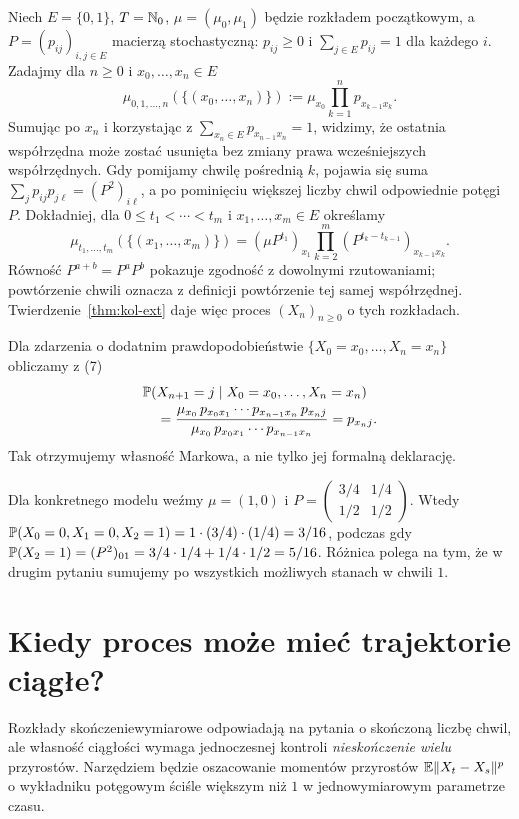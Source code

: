 \begin{przyklad}
Niech $E=\{0,1\}$, $T=\mathbb{N}_0$, $\mu=(\mu_0,\mu_1)$
będzie rozkładem początkowym, a
$P=(p_{ij})_{i,j\in E}$ macierzą stochastyczną:
$p_{ij}\ge0$ i $\sum_{j\in E}p_{ij}=1$ dla każdego $i$.
Zadajmy dla $n\ge0$ i $x_0,\ldots,x_n\in E$
\[
\mu_{0,1,\ldots,n}(\{(x_0,\ldots,x_n)\})
:=\mu_{x_0}\prod_{k=1}^n p_{x_{k-1}x_k}.
\tag{7}
\]
Sumując po $x_n$ i korzystając z
$\sum_{x_n\in E}p_{x_{n-1}x_n}=1$, widzimy,
że ostatnia współrzędna może zostać usunięta
bez zmiany prawa wcześniejszych współrzędnych.
Gdy pomijamy chwilę pośrednią $k$, pojawia się suma
$\sum_j p_{ij}p_{j\ell}=(P^2)_{i\ell}$,
a po pominięciu większej liczby chwil
odpowiednie potęgi $P$.
Dokładniej, dla $0\le t_1<\cdots<t_m$ i
$x_1,\ldots,x_m\in E$ określamy
\[
\mu_{t_1,\ldots,t_m}(\{(x_1,\ldots,x_m)\})
=(\mu P^{t_1})_{x_1}
\prod_{k=2}^m (P^{t_k-t_{k-1}})_{x_{k-1}x_k}.
\]
Równość $P^{a+b}=P^aP^b$ pokazuje zgodność
z dowolnymi rzutowaniami; powtórzenie chwili
oznacza z definicji powtórzenie tej samej współrzędnej.
Twierdzenie~\ref{thm:kol-ext} daje więc proces
$(X_n)_{n\ge0}$ o tych rozkładach.

Dla zdarzenia o dodatnim prawdopodobieństwie
$\{X_0=x_0,\ldots,X_n=x_n\}$ obliczamy z (7)
\[
\begin{aligned}
&\mathbb{P}(X_{n+1}=j\mid X_0=x_0,\ldots,X_n=x_n)\\
&\quad=\frac{\mu_{x_0}\,p_{x_0x_1}\cdots
p_{x_{n-1}x_n}\,p_{x_nj}}
{\mu_{x_0}\,p_{x_0x_1}\cdots p_{x_{n-1}x_n}}
=p_{x_nj}.
\end{aligned}
\]
Tak otrzymujemy własność Markowa, a nie tylko
jej formalną deklarację.

Dla konkretnego modelu weźmy
$\mu=(1,0)$ i
$P=\begin{pmatrix}3/4&1/4\\1/2&1/2\end{pmatrix}$.
Wtedy $\mathbb{P}(X_0=0,X_1=0,X_2=1)
=1\cdot(3/4)\cdot(1/4)=3/16$, podczas gdy
$\mathbb{P}(X_2=1)=(P^2)_{01}
=3/4\cdot1/4+1/4\cdot1/2=5/16$.
Różnica polega na tym, że w drugim pytaniu
sumujemy po wszystkich możliwych stanach w chwili $1$.
\end{przyklad}

\section{Kiedy proces może mieć trajektorie ciągłe?}
Rozkłady skończeniewymiarowe odpowiadają na pytania o
skończoną liczbę chwil, ale własność ciągłości wymaga
jednoczesnej kontroli \emph{nieskończenie wielu} przyrostów.
Narzędziem będzie oszacowanie momentów przyrostów
$\mathbb{E}\lVert X_t-X_s\rVert^p$ o wykładniku potęgowym ściśle
większym niż $1$ w jednowymiarowym parametrze czasu.

